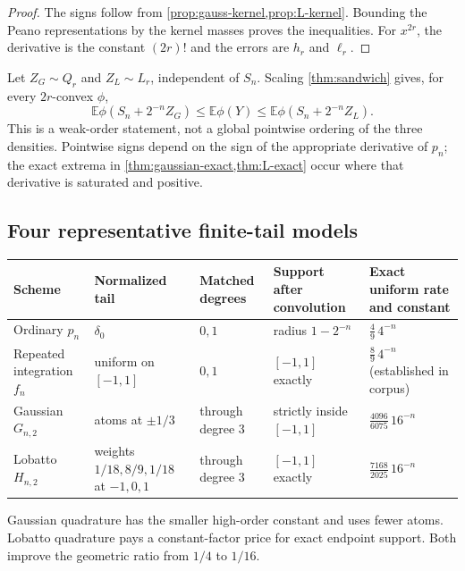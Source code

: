 \documentclass[11pt]{article}
\numberwithin{equation}{section}
\theoremstyle{definition}
\theoremstyle{remark}
\newcommand{\E}{\mathbb E}
\begin{document}
\begin{proof}
The signs follow from \cref{prop:gauss-kernel,prop:L-kernel}.  Bounding the Peano representations by the kernel masses proves the inequalities.  For $x^{2r}$, the derivative is the constant $(2r)!$ and the errors are $h_r$ and $\ell_r$.
\end{proof}

Let $Z_G\sim Q_r$ and $Z_L\sim L_r$, independent of $S_n$.  Scaling \cref{thm:sandwich} gives, for every $2r$-convex $\phi$,
\begin{equation}
 \boxed{
 \E\phi(S_n+2^{-n}Z_G)
 \le \E\phi(Y)
 \le \E\phi(S_n+2^{-n}Z_L).}
 \label{eq:full-sandwich}
\end{equation}
This is a weak-order statement, not a global pointwise ordering of the three densities.  Pointwise signs depend on the sign of the appropriate derivative of $p_n$; the exact extrema in \cref{thm:gaussian-exact,thm:L-exact} occur where that derivative is saturated and positive.

\subsection{Four representative finite-tail models}

\begin{center}
\begin{tabularx}{0.98\textwidth}{@{}p{}p{}p{}p{}X@{}}
\toprule
Scheme & Normalized tail & Matched degrees & Support after convolution & Exact uniform rate and constant\\
\midrule
Ordinary $p_n$ & $\delta_0$ & $0,1$ & radius $1-2^{-n}$ & \(\frac49\,4^{-n}\)\\
Repeated integration $f_n$ & uniform on $[-1,1]$ & $0,1$ & $[-1,1]$ exactly & \(\frac89\,4^{-n}\) (established in corpus)\\
Gaussian $G_{n,2}$ & atoms at $\pm1/3$ & through degree $3$ & strictly inside $[-1,1]$ & \(\frac{4096}{6075}\,16^{-n}\)\\
Lobatto $H_{n,2}$ & weights $1/18,8/9,1/18$ at $-1,0,1$ & through degree $3$ & $[-1,1]$ exactly & \(\frac{7168}{2025}\,16^{-n}\)\\
\bottomrule
\end{tabularx}
\end{center}

Gaussian quadrature has the smaller high-order constant and uses fewer atoms.  Lobatto quadrature pays a constant-factor price for exact endpoint support.  Both improve the geometric ratio from $1/4$ to $1/16$.
\end{document}
